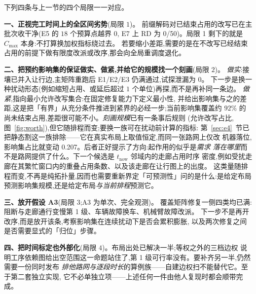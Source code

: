 \documentclass[manuscript,screen,review]{acmart}
\newcommand{\NPairs}{50}
\newcommand{\RzeroPastLo}{0}
\newcommand{\ClosureAliveFrac}{92\%}
\newcommand{\PubCloSpread}{0.207}
\newcommand{\RedecodeBad}{0/\NPairs}
\begin{document}
下列四条与上一节的四个局限一一对应。

\textbf{一、正视完工时间上的全区间劣势}(局限 \(1\))。
前缀解码对已结束占用的改写已在主批次收干净(E5 的 \(18\) 个预算点越界 \(\RzeroPastLo\),
E7 上 RD 为 \RedecodeBad)。局限 1 剩下的就是 \(C_{\max}\) 本身:不打算换加权指标绕过去。
若要缩小差距,需要的是在不改写已经结束占用的前提下做有限度改派或改序,那会向全局重调度退化。

\textbf{二、把预约影响集的保证做实、做紧,并给它的规模找一个刻画}(局限 \(2\))。
\emph{做实}:接壤已并入让行边,主矩阵重跑后 E1/E2/E3 仍满通过,试探泄漏为 \(0\)。
下一步是换一种扰动形态(例如缩短占用、或延后超过 \(1\) 个单位)再探,而不是再补同一条边。
\emph{做紧},指向最小允许改写集合:在固定修复能力下定义最小性,
并给出影响集与之的差距,这是把「有界」从充分条件推进到紧界的必经一步;当前影响集覆盖约
\(\ClosureAliveFrac\) 的尚未结束占用,差距很可能不小。\emph{刻画规模}已有一条事后规则
(允许改写占比,图~\ref{fig:worth}),但它随排程而变;要换一族可在扰动前计算的指标:
第~\ref{sec:e4}~节已把静态割这一族排除——它在真实布局上取值恒定,而同一张路网上仅改
机器落位,影响集占比就变动 \PubCloSpread。后者正好提示了方向:起作用的似乎是\emph{需求
落在哪里}而不是路网提供了什么。下一个候选是 \(t_{\mathrm{now}}\) 邻域内的走廊占用时序
密度,例如受扰走廊在其繁忙窗口内的重叠占用条数、以及该走廊在让行图上的出度。
这类量随排程而变,不再是纯拓扑量,因而也需要重新界定「可预测性」问的是什么:是给定布局
预测影响集规模,还是给定布局\emph{与当前排程}预测它。

\textbf{三、放开假设 A3}(局限 \(3\);A3 为单次、完全观测)。
覆盖矩阵修复一侧四类均已满:阻断与走廊通行变慢第 1 级、车辆故障换车、机械臂故障改派。
下一步不是再开改序,而是放开该条,考察影响集在连续扰动下是否会累积膨胀,
以及两次修复之间是否需要显式的「归位」步骤。

\textbf{四、把时间标定也外部化}(局限 \(4\))。布局出处已解决一半;等权之外的三档边权
说明工序依赖图给出空范围这一命题站住了,第 1 级可行率没有。要补齐另一半,仍然需要一份同时发布
\emph{排他路网与逐段时长}的算例族——自建边权扫不能替代它。至于第二套独立实现,
它不必单独立项——上述任何一件由他人复现时都会顺带完成。



\end{document}

